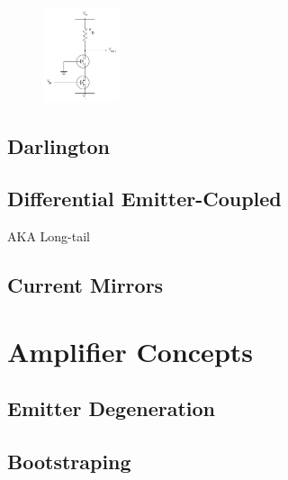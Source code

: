 \documentclass{report}
\newcommand{\imwidth}{0.2\textwidth}
\begin{document}
\begin{figure}
\centering
\includegraphics[width = \imwidth]{CascodeWithNegative}
\caption{}
\end{figure}


\section{Darlington}
\section{Differential Emitter-Coupled}
AKA Long-tail
\section{Current Mirrors}

\chapter{Amplifier Concepts}
\section{Emitter Degeneration}
\section{Bootstraping}

\nocite{*}
\printbibliography
\end{document}
